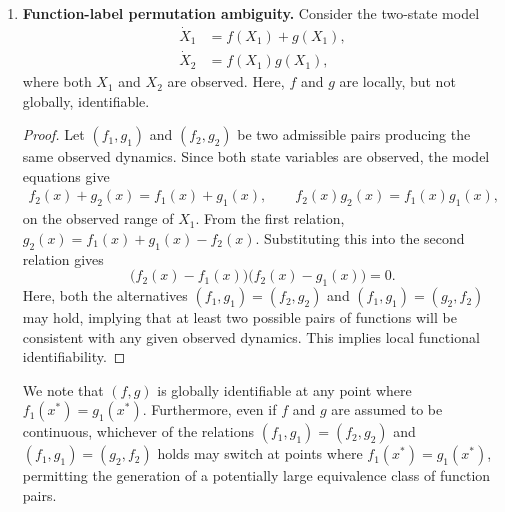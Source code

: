 \documentclass{article}
\theoremstyle{plain}
\theoremstyle{definition}
\begin{document}
{\begin{enumerate}
    \item \textbf{Function-label permutation ambiguity.} Consider the two-state model
    \begin{align*}
        \dot{X}_1 &= f(X_1)+g(X_1),\\
        \dot{X}_2 &= f(X_1)g(X_1),
    \end{align*}
    where both $X_1$ and $X_2$ are observed. Here, $f$ and $g$ are locally, but not globally, identifiable.
    \begin{proof}[Proof]
        Let $(f_1,g_1)$ and $(f_2,g_2)$ be two admissible pairs producing the same observed dynamics. Since both state variables are observed, the model equations give
        \begin{align*}
            f_2(x)+g_2(x)=f_1(x)+g_1(x),
            \qquad
            f_2(x)g_2(x)=f_1(x)g_1(x),
        \end{align*}
        on the observed range of $X_1$. From the first relation, $g_2(x)=f_1(x)+g_1(x)-f_2(x)$. Substituting this into the second relation gives
        \begin{equation*}
            \bigl(f_2(x)-f_1(x)\bigr)\bigl(f_2(x)-g_1(x)\bigr)=0.
        \end{equation*}
        Here, both the alternatives $(f_1,g_1)=(f_2,g_2)$ and $(f_1,g_1)=(g_2,f_2)$ may hold, implying that at least two possible pairs of functions will be consistent with any given observed dynamics. This implies local functional identifiability.
    \end{proof}

    We note that $(f,g)$ is globally identifiable at any point where $f_1(x^*)=g_1(x^*)$. Furthermore, even if $f$ and $g$ are assumed to be continuous, whichever of the relations $(f_1,g_1)=(f_2,g_2)$ and $(f_1,g_1)=(g_2,f_2)$ holds may switch at points where $f_1(x^*)=g_1(x^*)$, permitting the generation of a potentially large equivalence class of function pairs.


\end{enumerate}}
\end{document}
